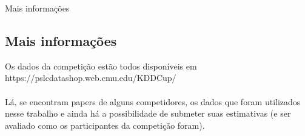 \documentclass{article}
\begin{document}
   \begin{section}{Mais informações}
      \subsection{Mais informações}
      Os dados da competição estão todos disponíveis em https://pslcdatashop.web.cmu.edu/KDDCup/ \\~\\

      Lá, se encontram papers de alguns competidores, os dados que foram utilizados nesse trabalho e ainda há a possibilidade de submeter suas estimativas (e ser avaliado como os participantes da competição foram).
      \\~\\
   \end{section}
\end{document}
